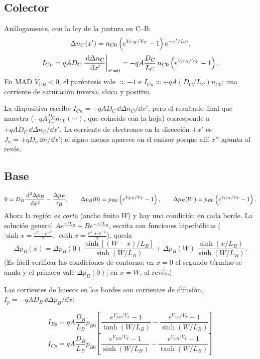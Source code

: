 \subsection{Colector}

Análogamente, con la ley de la juntura en C--B:
\[
  \Delta n_C(x') = n_{C0}\left(e^{V_{CB}/V_T}-1\right) e^{-x'/L_C},
\]
\[
  I_{Cn} = qAD_C\left.\frac{\,\mathrm{d}\Delta n_C}{\,\mathrm{d} x'}\right|_{x'=0}
         = -qA\frac{D_C}{L_C}\,n_{C0}\left(e^{V_{CB}/V_T}-1\right) .
\]
En MAD $V_{CB}<0$, el paréntesis vale $\approx-1$ e $I_{Cn}\approx+qA(D_C/L_C)n_{C0}$: una
corriente de saturación inversa, chica y positiva.

\begin{ojo}
La diapositiva escribe $I_{Cn}=-qAD_C\,\dd\Delta n_C/\dd x'$, pero el resultado final que
muestra ($-qA\frac{D_C}{L_C}n_{C0}(\cdots)$, que coincide con la hoja) corresponde a
$+qAD_C\,\dd\Delta n_C/\dd x'$. La corriente de electrones en la dirección $+x'$ es
$J_n=+qD_n\,\dd n/\dd x'$; el signo menos aparece en el emisor porque allí $x''$ apunta al revés.
\end{ojo}

\subsection{Base}

\[
  0 = D_B\frac{\,\mathrm{d}^2\Delta p_B}{\,\mathrm{d} x^2} - \frac{\Delta p_B}{\tau_B},
  \qquad
  \Delta p_B(0) = p_{B0}\left(e^{V_{EB}/V_T}-1\right),
  \qquad
  \Delta p_B(W) = p_{B0}\left(e^{V_{CB}/V_T}-1\right) .
\]
Ahora la región es \emph{corta} (ancho finito $W$) y hay una condición en cada borde. La
solución general $Ae^{x/L_B}+Be^{-x/L_B}$, escrita con funciones hiperbólicas
($\sinh x=\frac{e^x-e^{-x}}{2}$, $\cosh x=\frac{e^x+e^{-x}}{2}$), queda
\begin{equation}
  \Delta p_B(x) = \Delta p_B(0)\,\frac{\sinh\left[(W-x)/L_B\right]}{\sinh(W/L_B)}
                + \Delta p_B(W)\,\frac{\sinh(x/L_B)}{\sinh(W/L_B)} .
  \label{eq:pB-exacta}
\end{equation}
(Es fácil verificar las condiciones de contorno: en $x=0$ el segundo término se anula y el
primero vale $\Delta p_B(0)$; en $x=W$, al revés.)

Las corrientes de huecos en los bordes son corrientes de difusión, $I_p=-qAD_B\,\dd\Delta p_B/\dd x$:

\begin{clave}
\[
  I_{Ep} = qA\frac{D_B}{L_B}p_{B0}\left[\frac{e^{V_{EB}/V_T}-1}{\tanh(W/L_B)}
         - \frac{e^{V_{CB}/V_T}-1}{\sinh(W/L_B)}\right]
\]
\[
  I_{Cp} = qA\frac{D_B}{L_B}p_{B0}\left[\frac{e^{V_{EB}/V_T}-1}{\sinh(W/L_B)}
         - \frac{e^{V_{CB}/V_T}-1}{\tanh(W/L_B)}\right]
\]
\end{clave}

